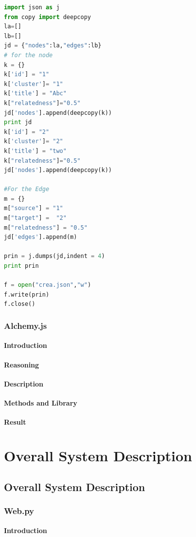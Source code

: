 \begin{lstlisting}[language=Python, caption=Creation of JSON Object using Python]
import json as j
from copy import deepcopy
la=[]
lb=[]
jd = {"nodes":la,"edges":lb}
# for the node 
k = {}
k['id'] = "1"
k['cluster']= "1"
k['title'] = "Abc"
k["relatedness"]="0.5"
jd['nodes'].append(deepcopy(k))
print jd
k['id'] = "2"
k['cluster']= "2"
k['title'] = "two"
k["relatedness"]="0.5"
jd['nodes'].append(deepcopy(k))

#For the Edge
m = {}
m["source"] = "1"
m["target"] =  "2"
m["relatedness"] = "0.5"
jd['edges'].append(m)

prin = j.dumps(jd,indent = 4)
print prin

f = open("crea.json","w")
f.write(prin)
f.close()
\end{lstlisting}
\subsection{Alchemy.js}
\subsubsection{Introduction}
\subsubsection{Reasoning}
\subsubsection{Description}
\subsubsection{Methods and Library}
\subsubsection{Result}

\chapter{Overall System Description}
\section{Overall System Description}
\subsection{Web.py}
\subsubsection{Introduction}
